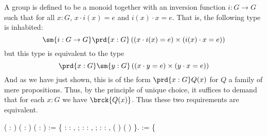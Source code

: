 A group is defined to be a monoid together with an inversion function $i : G
\to G$ such that for all $x : G$, $x \cdot i(x) = e$ and $i(x) \cdot x = e$.
That is, the following type is inhabited:
\[
  \sm{i : G \to G}\prd{x : G}\left(
    (x \cdot i(x) = e) \times (i(x) \cdot x = e)
  \right)
\]
but this type is equivalent to the type
\[
  \prd{x : G}\sm{y : G}
  \left(
    (x \cdot y = e) \times (y \cdot x = e)
  \right)
\]
And as we have just shown, this is of the form $\prd{x:G} Q(x)$ for $Q$ a
family of mere propositions.  Thus, by the principle of unique choice, it
suffices to demand that for each $x : G$ we have $\brck{Q(x)}$.  Thus these two
requirements are equivalent.
\begin{coqdoccode}
\coqdocemptyline
\coqdocnoindent
{}  ( : ) ( :     ) ( : ) \coqdoceol
\coqdocindent{1.00em}
:=  \{\coqdoceol
\coqdocindent{4.50em}
 : \coqdockw{\ensuremath{\forall}}  : ,    \coqdocnotation{=}  ;\coqdoceol
\coqdocindent{4.50em}
 : \coqdockw{\ensuremath{\forall}}  : ,    \coqdocnotation{=}  ;\coqdoceol
\coqdocindent{4.50em}
 : \coqdockw{\ensuremath{\forall}}    : ,   (  ) \coqdocnotation{=}  (  ) \coqdoceol
\coqdocindent{3.50em}
\}.\coqdoceol
\coqdocemptyline
\coqdocnoindent
{}  \coqdoceol
\coqdocindent{1.00em}
:=  \{\coqdoceol

\end{coqdoccode}
